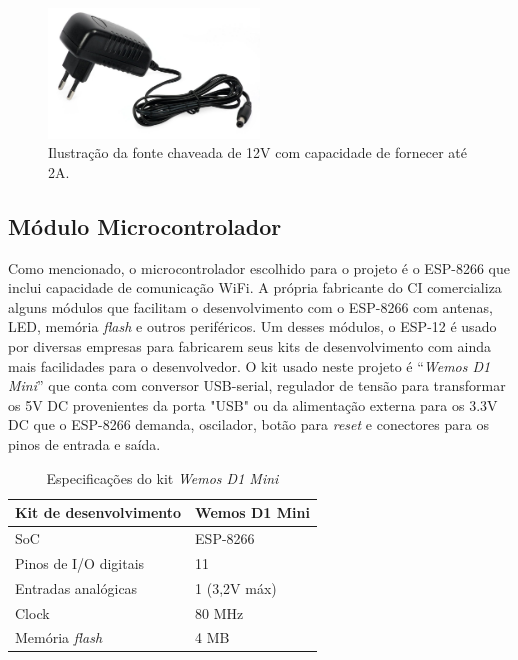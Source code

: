 \begin{figure}[ht]
    \begin{center}
    \includegraphics[width=0.5\textwidth]{figuras/fonte.jpg}
    \end{center}
    \caption[Ilustração da fonte chaveada de 12V.]{Ilustração da fonte chaveada de 12V com capacidade de fornecer até 2A.}
    \label{fonte}
\end{figure}

\subsection{Módulo Microcontrolador}

Como mencionado, o microcontrolador escolhido para o projeto é o ESP-8266 que inclui capacidade de comunicação WiFi. A própria fabricante do CI comercializa alguns módulos que facilitam o desenvolvimento com o ESP-8266 com antenas, LED, memória \textit{flash} e outros periféricos. Um desses módulos, o ESP-12 é usado por diversas empresas para fabricarem seus kits de desenvolvimento com ainda mais facilidades para o desenvolvedor. O kit usado neste projeto é “\textit{Wemos D1 Mini}” que conta com conversor USB-serial, regulador de tensão para transformar os 5V DC provenientes da porta "USB" ou da alimentação externa para os 3.3V DC que o ESP-8266 demanda, oscilador, botão para \textit{reset} e conectores para os pinos de entrada e saída.

\begin{table}
    \centering
    \label{wemos_dados}
    \caption{Especificações do kit \textit{Wemos D1 Mini}}
    \begin{tabular}{ll} 
        \hline
        Kit de desenvolvimento          & Wemos D1 Mini  \\ 
        \hline
        SoC                             & ESP-8266       \\ 
        \hline
        Pinos de I/O digitais           & 11             \\ 
        \hline
        Entradas analógicas             & 1 (3,2V máx)   \\ 
        \hline
        Clock                           & 80 MHz         \\ 
        \hline
        Memória \textit{flash}          & 4 MB           \\
        \hline
    \end{tabular}
\end{table}

